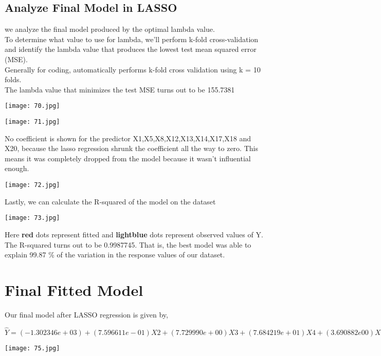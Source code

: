 \documentclass[a4paper,12pt,twoside]{book}
\begin{document}
\subsection{Analyze Final Model in LASSO}
we analyze the final model produced by the optimal lambda value.\\
To determine what value to use for lambda, we’ll perform k-fold cross-validation and identify the lambda value that produces the lowest test mean squared error (MSE).\\
Generally for coding, automatically performs k-fold cross validation using k = 10 folds.\\
The lambda value that minimizes the test MSE turns out to be 155.7381
\begin{center}
\texttt{[image: 70.jpg]}\\
\end{center}
\begin{center}
\texttt{[image: 71.jpg]}\\
\end{center}
No coefficient is shown for the predictor X1,X5,X8,X12,X13,X14,X17,X18 and X20, because the lasso regression shrunk the coefficient all the way to zero. This means it was completely dropped from the model because it wasn’t influential enough.
\begin{center}
\texttt{[image: 72.jpg]}\\
\end{center}
Lastly, we can calculate the R-squared of the model on the dataset
\begin{center}
\texttt{[image: 73.jpg]}\\
\end{center}
Here \textbf{red} dots represent fitted and \textbf{lightblue} dots represent observed values of Y.\\
The R-squared turns out to be 0.9987745. That is, the best model was able to explain 99.87 \% of the variation in the response values of our dataset.
\section*{Final Fitted Model}
Our final model after LASSO regression is given by,
\begin{center}
$\hat{Y}= (-1.302346e+03)+(7.596611e-01)X2+(7.729990e+00)X3+(7.684219e+01)X4+(3.690882e00)X6+(6.081934e-01)X7+(-3.099209e-01)X9+(1.968277e-02)X11+(7.631350e-01)X15+(4.947532e-02)X16+(-2.091705e-01)X19$
\end{center}
\begin{center}
\texttt{[image: 75.jpg]}\\
\end{center}
\end{document}
